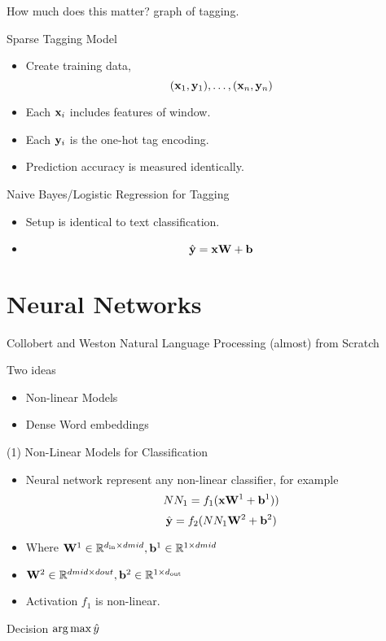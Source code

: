 \documentclass{beamer}
\begin{document}
\begin{frame}{How much does this matter?}
  graph of tagging.
\end{frame}

\begin{frame}{Sparse Tagging Model}
  \begin{itemize}
  \item Create training data,
    \[ (\mathbf{x}_1, \mathbf{y}_1),\ldots , (\mathbf{x}_n, \mathbf{y}_n)\]
  \item Each $\mathbf{x}_i$ includes features of window.
  \item Each $\mathbf{y}_i$ is the one-hot tag encoding.
  \item Prediction accuracy is measured identically. 
  \end{itemize}
\end{frame}


\begin{frame}{Naive Bayes/Logistic Regression for Tagging}
  \begin{itemize}
  \item Setup is identical to text classification.

  \item \[ \hat{\mathbf{y}} = \mathbf{x} \mathbf{W} + \bold b \] 
  \end{itemize}
\end{frame}

\section{Neural Networks}

\begin{frame}
  Collobert and Weston 
  Natural Language Processing (almost) from Scratch
\end{frame}

\begin{frame}{Two ideas}


  \begin{itemize}
  \item Non-linear Models
  \item Dense Word embeddings
  \end{itemize}
\end{frame}


\begin{frame}{(1) Non-Linear Models for Classification}
  \begin{itemize}
  \item Neural network represent any non-linear classifier, for example
    \[ NN_1 = f_1(\mathbf{x} \mathbf{W}^1 + \mathbf{b}^1))  \]
    \[ \hat{\mathbf{y}} = f_2(NN_1 \mathbf{W}^2 + \mathbf{b}^2)  \]
  \item Where $\mathbf{W}^1 \in \mathbb{R}^{{d_{\mathrm{in}}} \times dmid}, \mathbf{b}^1 \in \mathbb{R}^{1\times dmid}$
  \item  $\mathbf{W}^2 \in \mathbb{R}^{dmid \times dout}, \mathbf{b}^2 \in \mathbb{R}^{1\times {d_{\mathrm{out}}}}$
  \item Activation $f_1$ is non-linear.
    
  \end{itemize}
  Decision $\argmax \hat{y}$ 
\end{frame}
\end{document}
